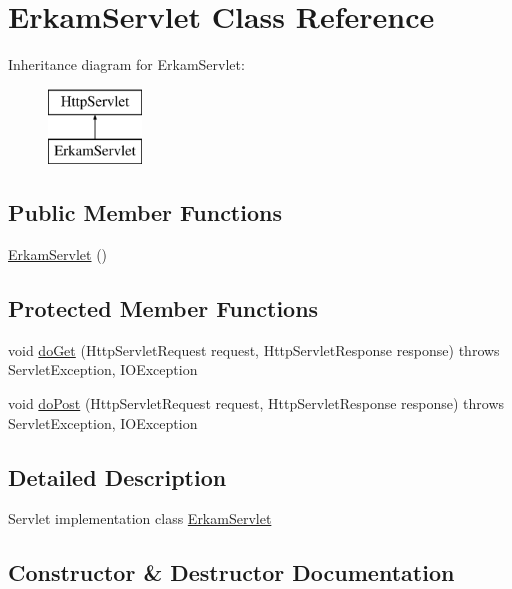 \hypertarget{class_erkam_servlet}{}\section{Erkam\+Servlet Class Reference}
\label{class_erkam_servlet}
Inheritance diagram for Erkam\+Servlet\+:\begin{figure}[H]
\begin{center}
\leavevmode
\includegraphics[height=2.000000cm]{class_erkam_servlet}
\end{center}
\end{figure}
\subsection*{Public Member Functions}
\begin{DoxyCompactItemize}
\item 
\hyperlink{class_erkam_servlet_a09f82dd182d218612d4c9c1d1019630b}{Erkam\+Servlet} ()
\end{DoxyCompactItemize}
\subsection*{Protected Member Functions}
\begin{DoxyCompactItemize}
\item 
void \hyperlink{class_erkam_servlet_acdeaf32ac42af0153d7504714b4406cb}{do\+Get} (Http\+Servlet\+Request request, Http\+Servlet\+Response response)  throws Servlet\+Exception, I\+O\+Exception 
\item 
void \hyperlink{class_erkam_servlet_a610c3680c6190db04f6637da6d642d2b}{do\+Post} (Http\+Servlet\+Request request, Http\+Servlet\+Response response)  throws Servlet\+Exception, I\+O\+Exception 
\end{DoxyCompactItemize}


\subsection{Detailed Description}
Servlet implementation class \hyperlink{class_erkam_servlet}{Erkam\+Servlet} 

\subsection{Constructor \& Destructor Documentation}
\hypertarget{class_erkam_servlet_a09f82dd182d218612d4c9c1d1019630b}{}
